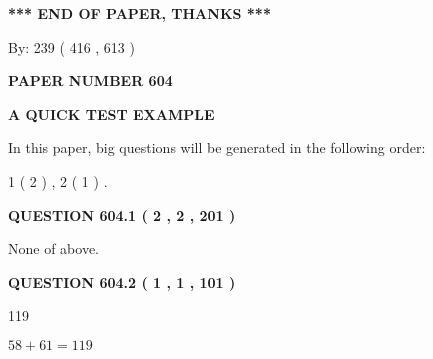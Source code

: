 \documentclass[12pt]{article}
\begin{document}
\vspace{1.0in} 
{\textbf{\large{ *** END OF PAPER, THANKS *** }}} 
   
   
\hspace{1.0in} By: 
 239 ( 416 ,  613 )
   
   
   
   
\newpage 
\setcounter{page}{ 
   604001 } 
   
   
   
   
 {\textbf{ \Large{ PAPER NUMBER  604  }}}
   
   
\vspace{0.2in}
   
   
   
   
   
   
 \vspace{0.2in}
{\LARGE {\textbf{ A QUICK TEST EXAMPLE}}}
   
   
   
\vspace{0.2in}
   
In this paper, big questions will be generated in the following order: 
   
   
   1 ( 2 )
 ,
   2 ( 1 )
 .
  
\vspace{0.2in}
  
{\textbf{\Large{QUESTION
604.1 
 ( 2 , 2 , 201 )
}}}
  
  
 
 
\noindent{}
 
 
 None of above.
 
 
 
 
  
\vspace{0.2in}
  
{\textbf{\Large{QUESTION
604.2 
 ( 1 , 1 , 101 )
}}}
  
  
 
 
\noindent{}

119
 
 
 
 
\noindent{}

$ %
58 +  %
61=   %
119$
 
\end{document}
